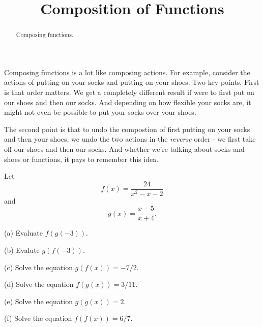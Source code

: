 \documentclass{ximera}
\title{Composition of Functions}
\begin{document}
\begin{abstract}
Composing functions.
\end{abstract}
\maketitle


Composing functions is a lot like composing actions. For example, consider the actions of putting on your socks and putting on your shoes. Two key points. First is that order matters. We get a completely different result if were to first put on our shoes and then our socks. And depending on how flexible your socks are, it might not even be possible to put your socks over your shoes.

The second point is that to undo the compostion of first putting on your socks and then your shoes, we undo the two actions in the \emph{reverse} order - we first take off our shoes and then our socks. And whether we're talking about socks and shoes or functions, it pays to remember this idea.

\begin{example}  \label{Ex0:Comp}
Let
\[
    f(x) = \frac{24}{x^2-x-2}
\]
and 
\[
    g(x) = \frac{x-5}{x+4} .
\]

(a) Evaluate $f(g(-3))$.

(b) Evalute $g(f(-3))$.

(c) Solve the equation $g(f(x))=-7/2$.

(d) Solve the equation $f(g(x)) = 3/11$.

(e) Solve the equation $g(g(x)) = 2$.

(f) Solve the equation $f(f(x)) = 6/7$.



\end{example}
\end{document}
